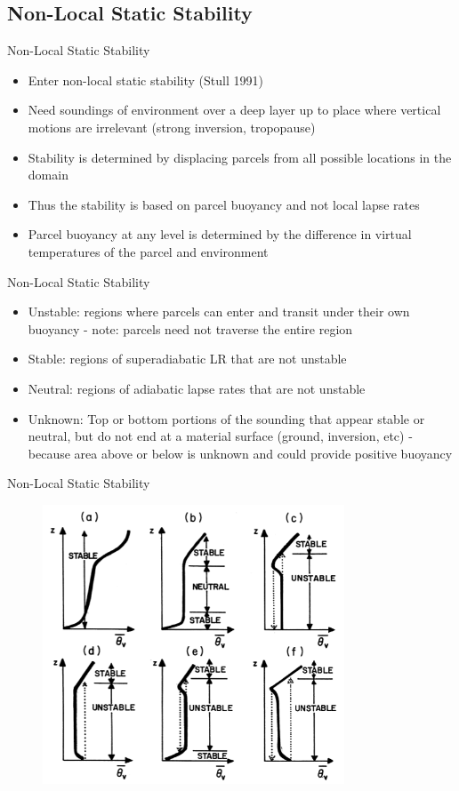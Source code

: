 \subsection{Non-Local Static Stability}
\begin{frame}{Non-Local Static Stability}
\begin{itemize}
	\item Enter non-local static stability (Stull 1991)
	\item Need soundings of environment over a deep layer up to place where vertical motions are irrelevant (strong inversion, tropopause)
	\item Stability is determined by displacing parcels from all possible locations in the domain
	\item Thus the stability is based on parcel buoyancy and not local lapse rates
	\item Parcel buoyancy at any level is determined by the difference in virtual temperatures of the parcel and environment
\end{itemize}
\end{frame}
\begin{frame}{Non-Local Static Stability}
\begin{itemize}
	\item Unstable: regions where parcels can enter and transit under their own buoyancy - note: parcels need not traverse the entire region
	\item Stable: regions of superadiabatic LR that are not unstable
	\item Neutral: regions of adiabatic lapse rates that are not unstable
	\item Unknown: Top or bottom portions of the sounding that appear stable or neutral, but do not end at a material surface (ground, inversion, etc) - because area above or below is unknown and could provide positive buoyancy
\end{itemize}
\end{frame}
\begin{frame}{Non-Local Static Stability}
\begin{figure}
	\includegraphics[width=0.8\textwidth]{fig10}
\end{figure}
\end{frame}



